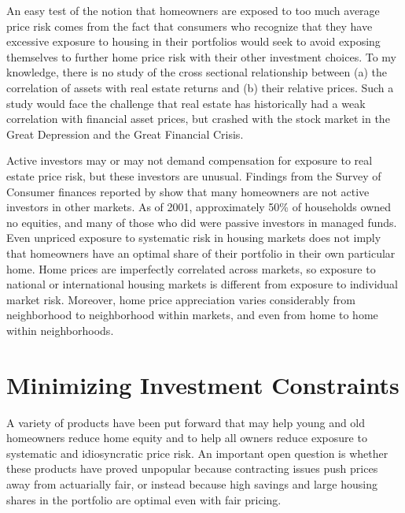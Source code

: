 \documentclass[12pt]{article}
\begin{document}
An easy test of the notion that homeowners are exposed to too much average price
risk comes from the fact that consumers who recognize that they have excessive
exposure to housing in their portfolios would seek to avoid exposing themselves
to further home price risk with their other investment choices.  To my
knowledge, there is no study of the cross sectional relationship between (a) the
correlation of assets with real estate returns and (b) their relative prices.
Such a study would face the challenge that real estate has historically had a
weak correlation with financial asset prices, but crashed with the stock market
in the Great Depression and the Great Financial Crisis.

Active investors may or may not demand compensation for exposure to real estate
price risk, but these investors are unusual.  Findings from the Survey of
Consumer finances reported by \textcite{AizcorbeKennickellMoore} show that many
homeowners are not active investors in other markets.  As of 2001, approximately
50\% of households owned no equities, and many of those who did were passive
investors in managed funds.  Even unpriced exposure to systematic risk in
housing markets does not imply that homeowners have an optimal share of their
portfolio in their own particular home.  Home prices are imperfectly correlated
across markets, so exposure to national or international housing markets is
different from exposure to individual market risk.  Moreover, home price
appreciation varies considerably from neighborhood to neighborhood within
markets, and even from home to home within neighborhoods.  

\section{Minimizing Investment Constraints}
A variety of products have been put forward that may help young and old
homeowners reduce home equity and to help all owners reduce exposure to
systematic and idiosyncratic price risk.  An important open question is whether
these products have proved unpopular because contracting issues push prices
away from actuarially fair, or instead because high savings and large housing
shares in the portfolio are optimal even with fair pricing.
\end{document}
